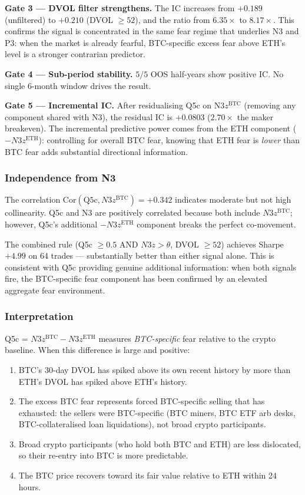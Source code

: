 \documentclass[12pt, a4paper]{article}
\theoremstyle{plain}
\theoremstyle{definition}
\newcommand{\Cor}{\mathrm{Cor}}
\begin{document}
\textbf{Gate 3 --- DVOL filter strengthens.}  The IC increases from $+0.189$
(unfiltered) to $+0.210$ (DVOL $\geq 52$), and the ratio from $6.35\times$
to $8.17\times$.  This confirms the signal is concentrated in the same
fear regime that underlies N3 and P3: when the market is already fearful,
BTC-specific excess fear above ETH's level is a stronger contrarian predictor.

\textbf{Gate 4 --- Sub-period stability.}  $5/5$ OOS half-years show
positive IC.  No single 6-month window drives the result.

\textbf{Gate 5 --- Incremental IC.}  After residualising Q5c on
N3$z^{\mathrm{BTC}}$ (removing any component shared with N3), the residual
IC is $+0.0803$ ($2.70\times$ the maker breakeven).  The incremental
predictive power comes from the ETH component ($-N3z^{\mathrm{ETH}}$):
controlling for overall BTC fear, knowing that ETH fear is \emph{lower}
than BTC fear adds substantial directional information.

\subsubsection{Independence from N3}

The correlation $\Cor(\text{Q5c}, N3z^{\mathrm{BTC}}) = +0.342$ indicates
moderate but not high collinearity.  Q5c and N3 are positively correlated
because both include $N3z^{\mathrm{BTC}}$; however, Q5c's additional
$-N3z^{\mathrm{ETH}}$ component breaks the perfect co-movement.

The combined rule (Q5c $\geq 0.5$ AND $N3z > \theta$, DVOL $\geq 52$)
achieves Sharpe $+4.99$ on 64 trades --- substantially better than either
signal alone.  This is consistent with Q5c providing genuine additional
information: when both signals fire, the BTC-specific fear component
has been confirmed by an elevated aggregate fear environment.

\subsubsection{Interpretation}

Q5c = $N3z^{\mathrm{BTC}} - N3z^{\mathrm{ETH}}$ measures
\emph{BTC-specific} fear relative to the crypto baseline.  When this
difference is large and positive:

\begin{enumerate}
  \item BTC's 30-day DVOL has spiked above its own recent history by more
        than ETH's DVOL has spiked above ETH's history.
  \item The excess BTC fear represents forced BTC-specific selling that
        has exhausted: the sellers were BTC-specific (BTC miners, BTC
        ETF arb desks, BTC-collateralised loan liquidations), not
        broad crypto participants.
  \item Broad crypto participants (who hold both BTC and ETH) are less
        dislocated, so their re-entry into BTC is more predictable.
  \item The BTC price recovers toward its fair value relative to ETH
        within 24 hours.
\end{enumerate}
\end{document}
